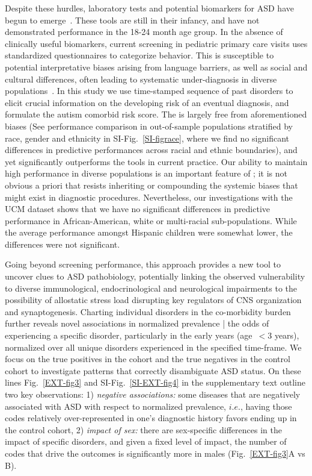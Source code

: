 \documentclass[onecolumn,10pt]{IEEEtran}
\begin{document}
Despite these hurdles, laboratory tests and potential biomarkers for ASD have begun to emerge~\cite{smith2020metabolomics,howsmon2017classification,hicks2018validation}. These tools are still in their infancy, and have not demonstrated performance in the 18-24 month age group. In the absence of clinically useful biomarkers,  current screening in pediatric primary care visits uses standardized  questionnaires to categorize behavior. This is  susceptible to potential interpretative biases arising from language barriers, as well as social and cultural differences, often leading to systematic under-diagnosis in diverse populations~\cite{hyman2020identification}. In this study we use  time-stamped sequence of past  disorders  to elicit crucial information on the developing risk of an eventual  diagnosis, and formulate the autism comorbid risk score. The \acor is largely free from aforementioned  biases (See performance comparison in out-of-sample populations stratified by race, gender and ethnicity in SI-Fig.~\ref{SI-figrace}, where we find no significant differences in predictive performances across racial and ethnic boundaries), and yet significantly outperforms the tools in current practice. Our ability to maintain high performance in diverse populations is an important feature of \acor; it is not obvious a priori that \acor resists  inheriting or compounding the systemic biases that might exist in diagnostic procedures.  Nevertheless, our investigations with the UCM dataset shows that we have no significant differences in predictive performance in  African-American, white or multi-racial sub-populations. While the average performance amongst Hispanic children were somewhat lower, the differences  were not significant. 

Going beyond screening performance, this approach provides a new tool to uncover clues to ASD pathobiology, potentially linking  the observed vulnerability to  diverse immunological, endocrinological  and neurological impairments to the possibility of allostatic  stress load  disrupting key regulators of  CNS  organization and  synaptogenesis. Charting individual disorders in the co-morbidity burden further reveals novel associations in normalized prevalence | the odds of experiencing a specific disorder, particularly in the early years (age~$<3$ years), normalized over all unique disorders experienced in the specified time-frame. We focus on  the true positives in the \treatment cohort and the true negatives in the control cohort to investigate  patterns that correctly disambiguate  ASD status. On these lines  Fig.~\ref{EXT-fig3} and SI-Fig.~\ref{SI-EXT-fig4}  in the supplementary text outline two key  observations: 1) \textit{negative associations:} some  diseases that are negatively associated with ASD  with respect to normalized prevalence, $i.e.$, having those codes relatively  over-represented  in one's diagnostic history favors ending up in the control cohort, 2) \textit{impact of sex:} there are sex-specific differences in the impact of specific disorders,  and given a fixed level of impact, the number of codes that drive the outcomes is significantly more in males (Fig.~\ref{EXT-fig3}A vs B).
\end{document}
